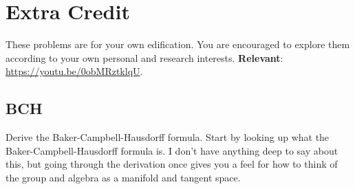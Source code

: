 \documentclass[12pt]{article}
\numberwithin{equation}{subsection}    %
\begin{document}
\section*{Extra Credit}

These problems are for your own edification. You are encouraged to explore them according to your own personal and research interests. \textbf{Relevant}: \url{https://youtu.be/0obMRztklqU}.


\subsection*{BCH}

Derive the Baker-Campbell-Hausdorff formula. Start by looking up what the Baker-Campbell-Hausdorff formula is. I don't have anything deep to say about this, but going through the derivation once gives you a feel for how to think of the group and algebra as a manifold and tangent space.
\end{document}
